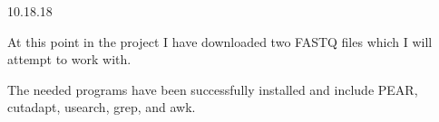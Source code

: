 10.18.18

At this point in the project I have downloaded two FASTQ files which I will attempt to work with.

The needed programs have been successfully installed and include PEAR, cutadapt, usearch, grep, and awk.